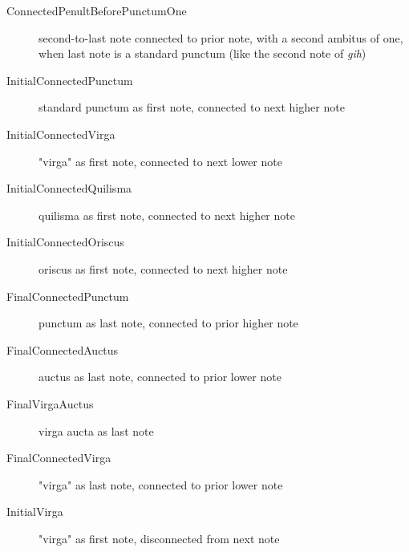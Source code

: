 \begin{shaded*}
\begin{description}
  \item[ConnectedPenultBeforePunctumOne] second-to-last note connected to prior note, with a second ambitus of one, when last note is a standard punctum (like the second note of \textit{gih})
  \item[InitialConnectedPunctum] standard punctum as first note, connected to next higher note
  \item[InitialConnectedVirga] "virga" as first note, connected to next lower note
  \item[InitialConnectedQuilisma] quilisma as first note, connected to next higher note
  \item[InitialConnectedOriscus] oriscus as first note, connected to next higher note
  \item[FinalConnectedPunctum] punctum as last note, connected to prior higher note
  \item[FinalConnectedAuctus] auctus as last note, connected to prior lower note
  \item[FinalVirgaAuctus] virga aucta as last note
  \item[FinalConnectedVirga] "virga" as last note, connected to prior lower note
  \item[InitialVirga] "virga" as first note, disconnected from next note
\end{description}
\end{shaded*}

